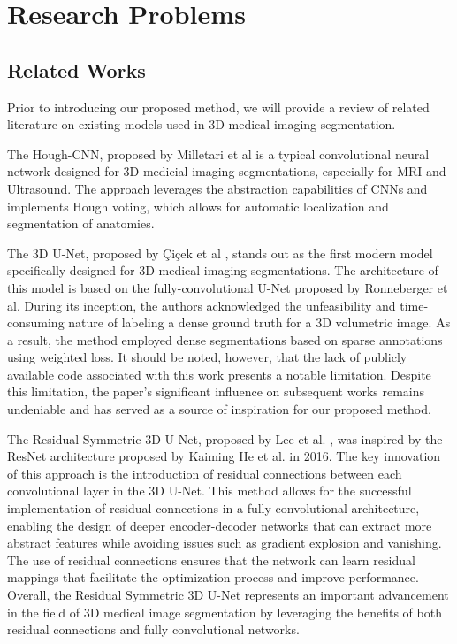 \documentclass{article}
\begin{document}
\section{Research Problems}
\subsection{Related Works}

Prior to introducing our proposed method, we will provide a review of related literature on existing models used in 3D medical imaging segmentation.

The Hough-CNN, proposed by Milletari et al \cite{28} is a typical convolutional neural network designed for 3D medicial imaging segmentations, especially for MRI and Ultrasound. The approach leverages the abstraction capabilities of CNNs and implements Hough voting, which allows for automatic localization and segmentation of anatomies. 

The 3D U-Net, proposed by Çiçek et al \cite{13}, stands out as the first modern model specifically designed for 3D medical imaging segmentations. The architecture of this model is based on the fully-convolutional U-Net proposed by Ronneberger et al. During its inception, the authors acknowledged the unfeasibility and time-consuming nature of labeling a dense ground truth for a 3D volumetric image. As a result, the method employed dense segmentations based on sparse annotations using weighted loss. It should be noted, however, that the lack of publicly available code associated with this work presents a notable limitation. Despite this limitation, the paper's significant influence on subsequent works remains undeniable and has served as a source of inspiration for our proposed method.

The Residual Symmetric 3D U-Net, proposed by Lee et al. \cite{29}, was inspired by the ResNet architecture proposed by Kaiming He et al. \cite{6} in 2016. The key innovation of this approach is the introduction of residual connections between each convolutional layer in the 3D U-Net. This method allows for the successful implementation of residual connections in a fully convolutional architecture, enabling the design of deeper encoder-decoder networks that can extract more abstract features while avoiding issues such as gradient explosion and vanishing. The use of residual connections ensures that the network can learn residual mappings that facilitate the optimization process and improve performance. Overall, the Residual Symmetric 3D U-Net represents an important advancement in the field of 3D medical image segmentation by leveraging the benefits of both residual connections and fully convolutional networks.
\end{document}
